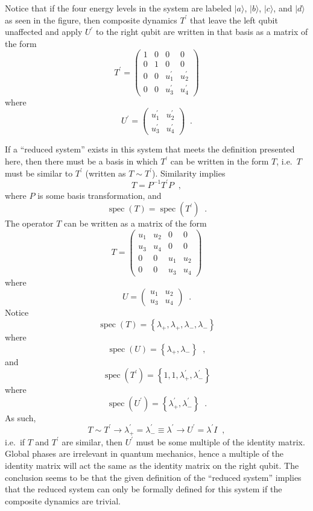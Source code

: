 Notice that if the four energy levels in the system are labeled $|a\rangle$, $|b\rangle$, $|c\rangle$, and $|d\rangle$ as seen in the figure, then composite dynamics $T^\prime$ that leave the left qubit unaffected and apply $U^\prime$ to the right qubit are written in that basis as a matrix of the form
$$
T^\prime = \begin{pmatrix}
1&0&0&0\\
0&1&0&0\\
0&0&u_1^\prime&u_2^\prime\\
0&0&u_3^\prime&u_4^\prime
\end{pmatrix}
$$
where
$$
U^\prime = \begin{pmatrix}
u_1^\prime&u_2^\prime\\
u_3^\prime&u_4^\prime
\end{pmatrix}\;\;.
$$

If a ``reduced system'' exists in this system that meets the definition presented here, then there must be a basis in which $T^\prime$ can be written in the form $T$, i.e.\ $T$ must be similar to $T^\prime$ (written as $T\sim T^\prime$).  Similarity implies
$$
T = P^{-1}T^\prime P\;\;,
$$
where $P$ is some basis transformation, and
$$
\mathop{spec}\left(T\right) = \mathop{spec}\left(T^\prime\right)\;\;.
$$
The operator $T$ can be written as a matrix of the form
$$
T = \begin{pmatrix}
u_1&u_2&0&0\\
u_3&u_4&0&0\\
0&0&u_1&u_2\\
0&0&u_3&u_4
\end{pmatrix}
$$
where
$$
U = \begin{pmatrix}
u_1&u_2\\
u_3&u_4
\end{pmatrix}\;\;.
$$
Notice
$$
\mathop{spec}\left(T\right) = \left\{\lambda_+,\lambda_+,\lambda_-,\lambda_-\right\}
$$
where
$$
\mathop{spec}\left(U\right) = \left\{\lambda_+,\lambda_-\right\}\;\;,
$$
and
$$
\mathop{spec}\left(T^\prime\right) = \left\{1,1,\lambda^{\prime}_+,\lambda^{\prime}_-\right\}
$$
where
$$
\mathop{spec}\left(U^{\prime}\right) = \left\{\lambda^{\prime}_+,\lambda^{\prime}_-\right\}\;\;.
$$
As such, 
$$
T\sim T^\prime \rightarrow \lambda^{\prime}_+=\lambda^{\prime}_-\equiv \lambda^\prime\rightarrow U^\prime = \lambda^\prime I\;\;,
$$
i.e.\ if $T$ and $T^\prime$ are similar, then $U^\prime$ must be some multiple of the identity matrix.  Global phases are irrelevant in quantum mechanics, hence a multiple of the identity matrix will act the same as the identity matrix on the right qubit.  The conclusion seems to be that the given definition of the ``reduced system'' implies that the reduced system can only be formally defined for this system if the composite dynamics are trivial.


